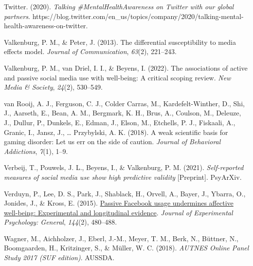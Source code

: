 \documentclass[
  man,mask,floatsintext]{apa7}
\newlength{\cslhangindent}
\newlength{\cslentryspacingunit} %
\newenvironment{CSLReferences}[2] %
 {%
  \setlength{\parindent}{0pt}
  \ifodd #1
  \let\oldpar\par
  \def\par{\hangindent=\cslhangindent\oldpar}
  \fi
  \setlength{\parskip}{#2\cslentryspacingunit}
 }%
 {}
\begin{document}
\begin{CSLReferences}{1}{0}
\leavevmode{}%
Twitter. (2020). \emph{Talking \#{MentalHealthAwareness} on {Twitter} with our global partners}. https://blog.twitter.com/en\_us/topics/company/2020/talking-mental-health-awareness-on-twitter.

\leavevmode{}%
Valkenburg, P. M., \& Peter, J. (2013). The differential susceptibility to media effects model. \emph{Journal of Communication}, \emph{63}(2), 221--243.

\leavevmode{}%
Valkenburg, P. M., van Driel, I. I., \& Beyens, I. (2022). The associations of active and passive social media use with well-being: {A} critical scoping review. \emph{New Media \& Society}, \emph{24}(2), 530--549.

\leavevmode{}%
van Rooij, A. J., Ferguson, C. J., Colder Carras, M., Kardefelt-Winther, D., Shi, J., Aarseth, E., Bean, A. M., Bergmark, K. H., Brus, A., Coulson, M., Deleuze, J., Dullur, P., Dunkels, E., Edman, J., Elson, M., Etchells, P. J., Fiskaali, A., Granic, I., Jansz, J., \ldots{} Przybylski, A. K. (2018). A weak scientific basis for gaming disorder: {Let} us err on the side of caution. \emph{Journal of Behavioral Addictions}, \emph{7}(1), 1--9.

\leavevmode{}%
Verbeij, T., Pouwels, J. L., Beyens, I., \& Valkenburg, P. M. (2021). \emph{Self-reported measures of social media use show high predictive validity} {[}Preprint{]}. {PsyArXiv}.

\leavevmode{}%
Verduyn, P., Lee, D. S., Park, J., Shablack, H., Orvell, A., Bayer, J., Ybarra, O., Jonides, J., \& Kross, E. (2015). \href{https://www.ncbi.nlm.nih.gov/pubmed/25706656}{Passive {Facebook} usage undermines affective well-being: {Experimental} and longitudinal evidence}. \emph{Journal of Experimental Psychology: General}, \emph{144}(2), 480--488.

\leavevmode{}%
Wagner, M., Aichholzer, J., Eberl, J.-M., Meyer, T. M., Berk, N., Büttner, N., Boomgaarden, H., Kritzinger, S., \& Müller, W. C. (2018). \emph{{AUTNES Online Panel Study} 2017 ({SUF} edition)}. {AUSSDA}.


\end{CSLReferences}
\end{document}
